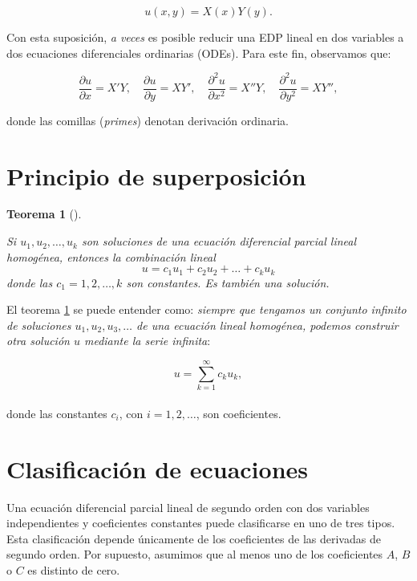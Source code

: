 \documentclass[
  spanish,
  us-letterpaper,
  DIV=11,
  numbers=noendperiod]{scrreprt}
\theoremstyle{plain}
\newtheorem{theorem}{Teorema}[chapter]
\theoremstyle{definition}
\theoremstyle{remark}
\begin{document}
\[
u(x, y) = X(x)Y(y).
\]

Con esta suposición, \emph{a veces} es posible reducir una EDP lineal en
dos variables a dos ecuaciones diferenciales ordinarias (ODEs). Para
este fin, observamos que:

\[
\dfrac{\partial u}{\partial x} = X'Y, \quad
\dfrac{\partial u}{\partial y} = XY', \quad
\dfrac{\partial^2 u}{\partial x^2} = X''Y, \quad
\dfrac{\partial^2 u}{\partial y^2} = XY'',
\]

donde las comillas (\emph{primes}) denotan derivación ordinaria.

\section{Principio de
superposición}\label{principio-de-superposiciuxf3n}

\begin{theorem}[]\protect\hypertarget{thm-superposition}{}\label{thm-superposition}

Si \(u_1 , u_2 , \dots , u_k\) son soluciones de una ecuación
diferencial parcial lineal homogénea, entonces la combinación lineal \[
u = c_1u_1 + c_2u_2 + \dots + c_ku_k
\] donde las \(c_1=1,2,\dots,k\) son constantes. Es también una
solución.

\end{theorem}

El teorema \ref{thm-superposition} se puede entender como: \emph{siempre
que tengamos un conjunto infinito de soluciones
\(u_1, u_2, u_3, \ldots\) de una ecuación lineal homogénea, podemos
construir otra solución \(u\) mediante la serie infinita}:

\[  
u = \sum_{k=1}^{\infty} c_k u_k,  
\]\\
donde las constantes \(c_i\), con \(i = 1, 2, \ldots\), son
coeficientes.

\section{Clasificación de
ecuaciones}\label{clasificaciuxf3n-de-ecuaciones}

Una ecuación diferencial parcial lineal de segundo orden con dos
variables independientes y coeficientes constantes puede clasificarse en
uno de tres tipos. Esta clasificación depende únicamente de los
coeficientes de las derivadas de segundo orden. Por supuesto, asumimos
que al menos uno de los coeficientes \(A\), \(B\) o \(C\) es distinto de
cero.
\end{document}

